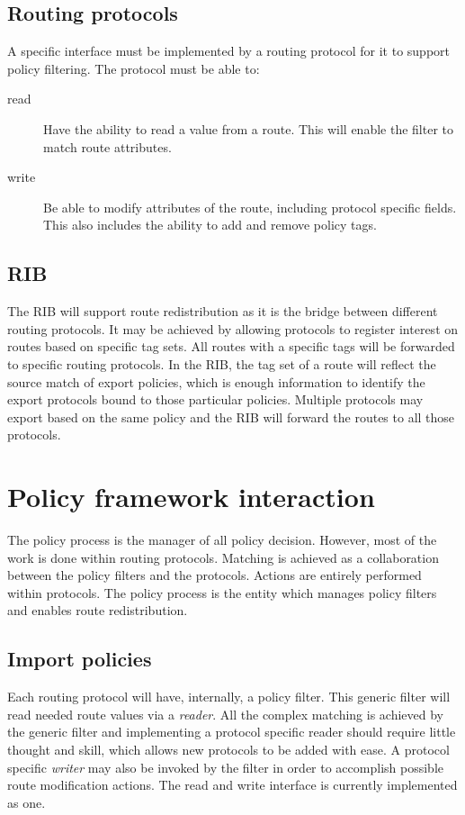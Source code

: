 \documentclass{article}
\begin{document}
\subsection{Routing protocols}
A specific interface must be implemented by a routing protocol for it to support
policy filtering. The protocol must be able to:
\begin{description}
\item[read] Have the ability to read a value from a route. This will enable the
filter to match route attributes.
\item[write] Be able to modify attributes of the route, including protocol
specific fields. This also includes the ability to add and remove policy tags.
\end{description}


\subsection{RIB}
The RIB will support route redistribution as it is the bridge between different
routing protocols. It may be achieved by allowing protocols to register interest
on routes based on specific tag sets. All routes with a specific tags will be
forwarded to specific routing protocols. In the RIB, the tag set of a route will
reflect the source match of export policies, which is enough information to
identify the export protocols bound to those particular policies. Multiple
protocols may export based on the same policy and the RIB will forward the
routes to all those protocols.

\section{Policy framework interaction}
The policy process is the manager of all policy decision. However, most of the
work is done within routing protocols. Matching is achieved as a collaboration
between the policy filters and the protocols. Actions are entirely performed
within protocols. The policy process is the entity which manages policy filters
and enables route redistribution.

\subsection{Import policies}
Each routing protocol will have, internally, a policy filter. This generic
filter will read needed route values via a {\em reader}. All the complex
matching is achieved by the generic filter and implementing a protocol specific
reader should require little thought and skill, which allows new protocols to be
added with ease. A protocol specific {\em writer} may also be invoked by the
filter in order to accomplish possible route modification actions. The read and
write interface is currently implemented as one.
\end{document}
